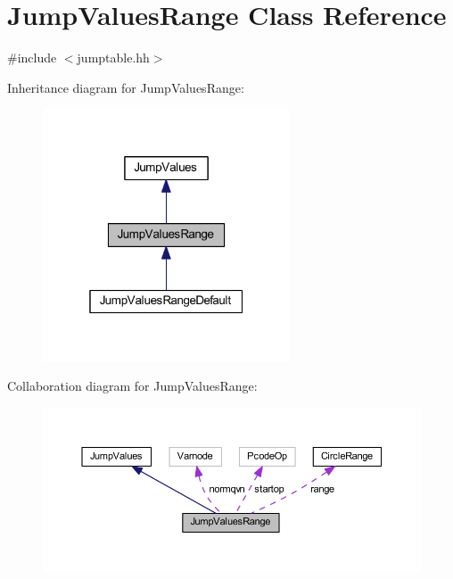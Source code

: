 \hypertarget{class_jump_values_range}{}\section{Jump\+Values\+Range Class Reference}
\label{class_jump_values_range}


{\ttfamily \#include $<$jumptable.\+hh$>$}



Inheritance diagram for Jump\+Values\+Range\+:
\nopagebreak
\begin{figure}[H]
\begin{center}
\leavevmode
\includegraphics[width=208pt]{class_jump_values_range__inherit__graph}
\end{center}
\end{figure}


Collaboration diagram for Jump\+Values\+Range\+:
\nopagebreak
\begin{figure}[H]
\begin{center}
\leavevmode
\includegraphics[width=350pt]{class_jump_values_range__coll__graph}
\end{center}
\end{figure}
